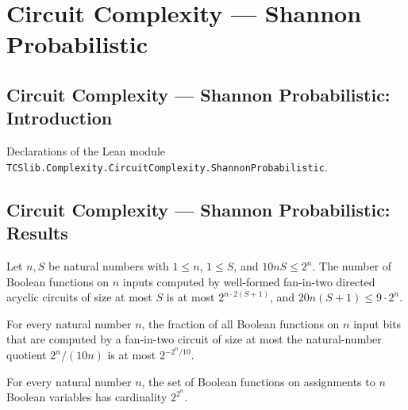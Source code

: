 \section{Circuit Complexity --- Shannon Probabilistic}
\subsection*{Circuit Complexity --- Shannon Probabilistic: Introduction}

Declarations of the Lean module \texttt{TCSlib.Complexity.CircuitComplexity.ShannonProbabilistic}.

\subsection*{Circuit Complexity --- Shannon Probabilistic: Results}

\begin{theorem}
\label{BoolCircuit.count_le_pow}
\leanok
{}
Let $n,S$ be natural numbers with $1 \le n$, $1 \le S$, and $10nS \le 2^n$. The number
of Boolean functions on $n$ inputs computed by well-formed fan-in-two directed acyclic
circuits of size at most $S$ is at most $2^{n\cdot 2(S+1)}$, and $20n(S+1) \le 9\cdot
2^n$.
\end{theorem}

\begin{theorem}
\label{BoolCircuit.computableDAG_shannon_fraction_le}
\leanok
{}
For every natural number $n$, the fraction of all Boolean functions on $n$ input bits
that are computed by a fan-in-two circuit of size at most the natural-number quotient
$2^n/(10n)$ is at most $2^{-2^n/10}$.
\end{theorem}

\begin{theorem}
\label{BoolCircuit.card_boolFun}
\leanok
{}
For every natural number $n$, the set of Boolean functions on assignments to $n$ Boolean
variables has cardinality $2^{2^n}$.
\end{theorem}

